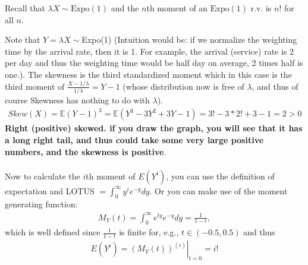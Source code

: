 
\setcounter{theorem}{15}
\begin{exercise} [BH.6.16]
	\begin{hint}
		Recall that $\lambda X \sim \text{Expo}(1)$ and the $n$th moment of an $\text{Expo}(1)$ r.v. is $n!$ for all $n$.
	\end{hint}
	\begin{solution}
		Note that $Y=\lambda X\sim $Expo(1) (Intuition would be: if we normalize the weighting time by the arrival rate, then it is 1. For example, the arrival (service) rate is 2 per day and thus the weighting time would be half day on average, 2 times half is one.). The skewness  is the third standardized moment which in this case is the third moment of $\frac{X-1/\lambda}{1/\lambda} = Y-1$ (whose distribution now is free of $\lambda$, and thus of course Skewness has nothing to do with $\lambda$).
		\begin{align*}
			Skew(X) =\mathbb{E}(Y-1)^3= \mathbb{E}(Y^3-3Y^2+3Y-1)=3! -3*2! +3-1=2>0
		\end{align*} 
		\textbf{Right (positive) skewed. if you draw the graph, you will see that it has a long right tail, and thus could take some very large positive numbers, and the skewness is positive}.~\\~\\
		Now to calculate the $i$th moment of $E(Y^i)$, you can use the definition of expectation and LOTUS $=\int_{0}^{\infty} y^i e^{-y}dy$.  Or you can make use of the moment generating function:
		\begin{align*}
			M_Y(t) = \int_{0}^{\infty} e^{ty} e^{-y}dy =\frac{1}{1-t},
		\end{align*}
		which is well defined since $\frac{1}{1-t}$ is finite for, e.g., $t\in(-0.5, 0.5)$ and thus 
		\begin{align*}
			E(Y^i) =\left.\left(M_Y(t)  \right)^{(i)}\right|_{t=0} = i!
		\end{align*} 
\end{solution}
\end{exercise}

